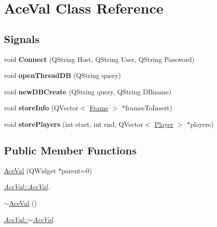 \hypertarget{classAceVal}{\section{Ace\-Val Class Reference}
\label{classAceVal}
}
\subsection*{Signals}
\begin{DoxyCompactItemize}
\item 
\hypertarget{classAceVal_aecbf3b36ad3558dee489643c4c04af32}{void {\bfseries Connect} (Q\-String Host, Q\-String User, Q\-String Password)}\label{classAceVal_aecbf3b36ad3558dee489643c4c04af32}

\item 
\hypertarget{classAceVal_a5e1c5c9897361ce65c4b9bd2859035b5}{void {\bfseries open\-Thread\-D\-B} (Q\-String query)}\label{classAceVal_a5e1c5c9897361ce65c4b9bd2859035b5}

\item 
\hypertarget{classAceVal_ae7b32eeee7aa51c3630c9747d328eaf6}{void {\bfseries new\-D\-B\-Create} (Q\-String query, Q\-String D\-Bname)}\label{classAceVal_ae7b32eeee7aa51c3630c9747d328eaf6}

\item 
\hypertarget{classAceVal_a83b9e57722b3dac8a18f797792163a9a}{void {\bfseries store\-Info} (Q\-Vector$<$ \hyperlink{structFrame}{Frame} $>$ $\ast$frames\-To\-Insert)}\label{classAceVal_a83b9e57722b3dac8a18f797792163a9a}

\item 
\hypertarget{classAceVal_a42959e954aa90edebe5e25cf9cb2f907}{void {\bfseries store\-Players} (int start, int end, Q\-Vector$<$ \hyperlink{classPlayer}{Player} $>$ $\ast$players)}\label{classAceVal_a42959e954aa90edebe5e25cf9cb2f907}

\end{DoxyCompactItemize}
\subsection*{Public Member Functions}
\begin{DoxyCompactItemize}
\item 
\hyperlink{classAceVal_aa8c4668b26df05d2f237097b6161f903}{Ace\-Val} (Q\-Widget $\ast$parent=0)
\begin{DoxyCompactList}\small\item\em \hyperlink{classAceVal_aa8c4668b26df05d2f237097b6161f903}{Ace\-Val\-::\-Ace\-Val}. \end{DoxyCompactList}\item 
\hyperlink{classAceVal_a69f8950b854fc3579ebc1395054ba6dc}{$\sim$\-Ace\-Val} ()
\begin{DoxyCompactList}\small\item\em \hyperlink{classAceVal_a69f8950b854fc3579ebc1395054ba6dc}{Ace\-Val\-::$\sim$\-Ace\-Val}. \end{DoxyCompactList}\end{DoxyCompactItemize}
